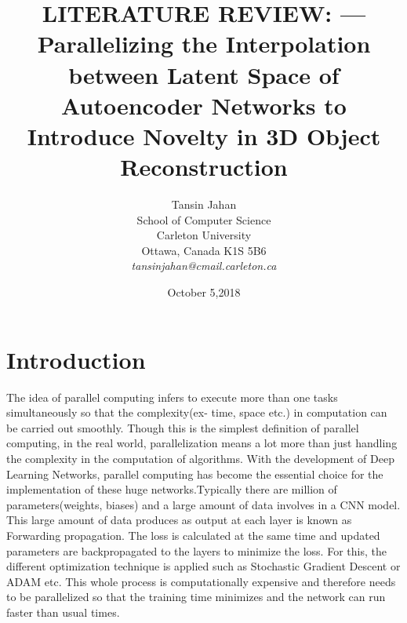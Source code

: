 \documentclass[11pt]{article}       %
\begin{document}


\title{LITERATURE REVIEW: --- Parallelizing the Interpolation between Latent Space of Autoencoder Networks to Introduce Novelty in 3D Object Reconstruction}


\author{
Tansin Jahan\\
School of Computer Science\\
Carleton University\\
Ottawa, Canada K1S 5B6\\
{\em tansinjahan@cmail.carleton.ca}
} %
\date{October 5,2018}
\maketitle



\section{Introduction} \label{intro}

The idea of parallel computing infers to execute more than one tasks simultaneously so that the complexity(ex- time, space etc.) in computation can be carried out smoothly. Though this is the simplest definition of parallel computing, in the real world, parallelization means a lot more than just handling the complexity in the computation of algorithms. With the development of Deep Learning Networks, parallel computing has become the essential choice for the implementation of these huge networks.Typically there are million of parameters(weights, biases) and a large amount of data involves in a CNN model. This large amount of data produces as output at each layer is known as Forwarding propagation. The loss is calculated at the same time and updated parameters are backpropagated to the layers to minimize the loss. For this, the different optimization technique is applied such as Stochastic Gradient Descent or ADAM etc. This whole process is computationally expensive and therefore needs to be parallelized so that the training time minimizes and the network can run faster than usual times. 
\end{document}
